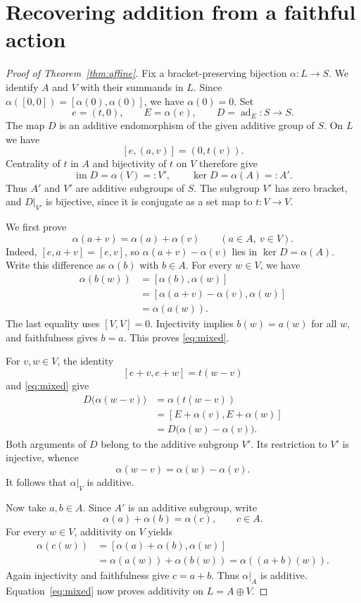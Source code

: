 \documentclass[11pt]{article}
\theoremstyle{definition}
\DeclareMathOperator{\im}{im}
\DeclareMathOperator{\ad}{ad}
\begin{document}
\section{Recovering addition from a faithful action}
\begin{proof}[Proof of Theorem~\ref{thm:affine}]
Fix a bracket-preserving bijection $\alpha:L\to S$. We identify $A$ and $V$ with their summands in $L$. Since $\alpha([0,0])=[\alpha(0),\alpha(0)]$, we have $\alpha(0)=0$. Set
\[
 e=(t,0),\qquad E=\alpha(e),\qquad D=\ad_E:S\to S.
\]
The map $D$ is an additive endomorphism of the given additive group of $S$. On $L$ we have
\[
 [e,(a,v)]=(0,t(v)).
\]
Centrality of $t$ in $A$ and bijectivity of $t$ on $V$ therefore give
\begin{equation}\label{eq:images}
 \im D=\alpha(V)=:V',\qquad \ker D=\alpha(A)=:A'.
\end{equation}
Thus $A'$ and $V'$ are additive subgroups of $S$. The subgroup $V'$ has zero bracket, and $D|_{V'}$ is bijective, since it is conjugate as a set map to $t:V\to V$.

We first prove
\begin{equation}\label{eq:mixed}
 \alpha(a+v)=\alpha(a)+\alpha(v)\qquad(a\in A,\ v\in V).
\end{equation}
Indeed, $[e,a+v]=[e,v]$, so $\alpha(a+v)-\alpha(v)$ lies in $\ker D=\alpha(A)$. Write this difference as $\alpha(b)$ with $b\in A$. For every $w\in V$, we have
\begin{align*}
 \alpha(b(w))
 &=[\alpha(b),\alpha(w)]\\
 &=[\alpha(a+v)-\alpha(v),\alpha(w)]\\
 &=\alpha(a(w)).
\end{align*}
The last equality uses $[V,V]=0$. Injectivity implies $b(w)=a(w)$ for all $w$, and faithfulness gives $b=a$. This proves \eqref{eq:mixed}.

For $v,w\in V$, the identity
\[
 [e+v,e+w]=t(w-v)
\]
and \eqref{eq:mixed} give
\begin{align*}
 D\bigl(\alpha(w-v)\bigr)
 &=\alpha(t(w-v))\\
 &=[E+\alpha(v),E+\alpha(w)]\\
 &=D\bigl(\alpha(w)-\alpha(v)\bigr).
\end{align*}
Both arguments of $D$ belong to the additive subgroup $V'$. Its restriction to $V'$ is injective, whence
\[
 \alpha(w-v)=\alpha(w)-\alpha(v).
\]
It follows that $\alpha|_V$ is additive.

Now take $a,b\in A$. Since $A'$ is an additive subgroup, write
\[
 \alpha(a)+\alpha(b)=\alpha(c),\qquad c\in A.
\]
For every $w\in V$, additivity on $V$ yields
\begin{align*}
 \alpha(c(w))
 &=[\alpha(a)+\alpha(b),\alpha(w)]\\
 &=\alpha(a(w))+\alpha(b(w))
 =\alpha((a+b)(w)).
\end{align*}
Again injectivity and faithfulness give $c=a+b$. Thus $\alpha|_A$ is additive. Equation~\eqref{eq:mixed} now proves additivity on $L=A\oplus V$.
\end{proof}
\end{document}
